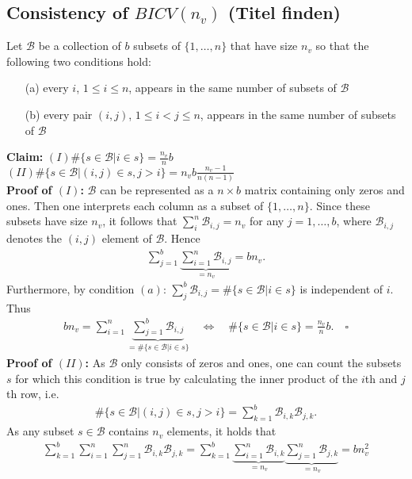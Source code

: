 \documentclass[Research_Module_ES.tex]{subfiles}
\begin{document}
\subsection{Consistency of $BICV(n_v)$ (Titel finden)}

Let $\mathcal{B}$ be a collection of $b$ subsets of $\{ 1,\dots,n\}$ that have size $n_v$ so that the following two conditions hold:
\begin{enumerate}
\item[(a)] every $i$, $1\le i \le n$, appears in the same number of subsets of $\mathcal{B}$
\item[(b)] every pair $(i,j)$, $1\le i < j \le n$, appears in the same number of subsets of $\mathcal{B}$
\end{enumerate}

\textbf{Claim:} $(I) \#\{s\in \mathcal{B}| i\in s\} = \frac{n_v}{n} b$ \\
$(II)\#\{s\in\mathcal{B}|(i,j)\in s, j>i\}=n_vb\frac{n_v-1}{n(n-1)}$ \\
\textbf{Proof of $(I)$:} 
$\mathcal{B}$ can be represented as a $n\times b$ matrix containing only zeros and ones. Then one interprets each column as a subset of $\{ 1,\dots,n\}$. Since these subsets have size $n_v$, it follows that $\sum_i^n \mathcal{B}_{i,j}=n_v$ for any $j= 1, \dots ,b$, where $\mathcal{B}_{i,j}$ denotes the $(i,j)$ element of $\mathcal{B}$. Hence
\begin{align*}
\sum_{j=1}^b\underbrace{\sum_{i=1}^n \mathcal{B}_{i,j}}_{=n_v} = bn_v.
\end{align*}
Furthermore, by condition $(a)$: $\sum_j^b \mathcal{B}_{i,j} = \#\{s\in \mathcal{B}| i\in s\}$ is independent of $i$. Thus 
\begin{align*}
bn_v = \sum_{i=1}^n\underbrace{\sum_{j=1}^b \mathcal{B}_{i,j}}_{=\#\{s\in \mathcal{B}| i\in s\}} \quad
\iff \quad \#\{s\in \mathcal{B}| i\in s\} = \frac{n_v}{n}b. \quad \square
\end{align*} 
\textbf{Proof of $(II)$:}
As $\mathcal{B}$ only consists of zeros and ones, one can count the subsets $s$ for which this condition is true by calculating the inner product of the $i$th and $j$th row, i.e.
\begin{align*}
\#\{s\in\mathcal{B}|(i,j)\in s, j>i\} = \sum_{k=1}^b\mathcal{B}_{i,k}\mathcal{B}_{j,k}.
\end{align*}
As any subset $s \in \mathcal{B}$ contains $n_v$ elements, it holds that
\begin{align*}
\sum_{k=1}^b\sum_{i=1}^n\sum_{j=1}^n\mathcal{B}_{i,k}\mathcal{B}_{j,k}= \sum_{k=1}^b\underbrace{\sum_{i=1}^n\mathcal{B}_{i,k}}_{=n_v}\underbrace{\sum_{j=1}^n\mathcal{B}_{j,k}}_{=n_v}=bn_v^2
\end{align*}
\end{document}
